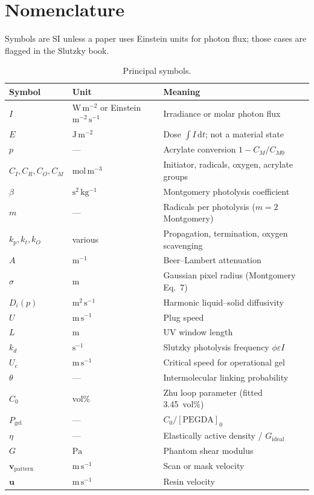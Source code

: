 \chapter{Nomenclature}
\label{ch:nom}

Symbols are SI unless a paper uses Einstein units for photon flux; those cases are flagged in the Slutzky book.

\begin{table}[htbp]
\centering
\caption{Principal symbols.}
\label{tab:nom}
\small
\begin{tabular}{@{}llp{7.4cm}@{}}
\toprule
Symbol & Unit & Meaning \\
\midrule
$I$ & $\mathrm{W\,m^{-2}}$ or Einstein $\mathrm{m^{-2}\,s^{-1}}$ & Irradiance or molar photon flux \\
$E$ & $\mathrm{J\,m^{-2}}$ & Dose $\int I\,\mathrm{d}t$; not a material state \\
$p$ & --- & Acrylate conversion $1-C_M/C_{M0}$ \\
$C_I,C_R,C_O,C_M$ & $\mathrm{mol\,m^{-3}}$ & Initiator, radicals, oxygen, acrylate groups \\
$\beta$ & $\mathrm{s^2\,kg^{-1}}$ & Montgomery photolysis coefficient \\
$m$ & --- & Radicals per photolysis ($m=2$ Montgomery) \\
$k_p,k_t,k_O$ & various & Propagation, termination, oxygen scavenging \\
$A$ & $\mathrm{m^{-1}}$ & Beer--Lambert attenuation \\
$\sigma$ & $\mathrm{m}$ & Gaussian pixel radius (Montgomery Eq.~7) \\
$D_i(p)$ & $\mathrm{m^2\,s^{-1}}$ & Harmonic liquid--solid diffusivity \\
$U$ & $\mathrm{m\,s^{-1}}$ & Plug speed \\
$L$ & $\mathrm{m}$ & UV window length \\
$k_d$ & $\mathrm{s^{-1}}$ & Slutzky photolysis frequency $\phi\varepsilon I$ \\
$U_c$ & $\mathrm{m\,s^{-1}}$ & Critical speed for operational gel \\
$\theta$ & --- & Intermolecular linking probability \\
$C_0$ & vol\% & Zhu loop parameter (fitted 3.45~vol\%) \\
$P_{\mathrm{gel}}$ & --- & $C_0/[\mathrm{PEGDA}]_0$ \\
$\eta$ & --- & Elastically active density / $G_{\mathrm{ideal}}$ \\
$G$ & $\mathrm{Pa}$ & Phantom shear modulus \\
$\mathbf{v}_{\mathrm{pattern}}$ & $\mathrm{m\,s^{-1}}$ & Scan or mask velocity \\
$\mathbf{u}$ & $\mathrm{m\,s^{-1}}$ & Resin velocity \\
\bottomrule
\end{tabular}
\end{table}

